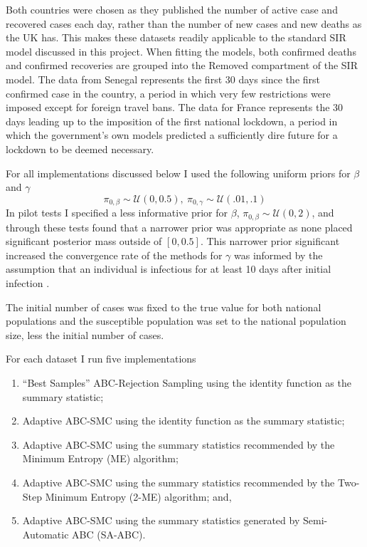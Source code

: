 \documentclass[11pt,a4paper]{article}
\theoremstyle{break}
\begin{document}
  \par Both countries were chosen as they published the number of active case and recovered cases each day, rather than the number of new cases and new deaths as the UK has. This makes these datasets readily applicable to the standard SIR model discussed in this project. When fitting the models, both confirmed deaths and confirmed recoveries are grouped into the Removed compartment of the SIR model. The data from Senegal represents the first 30 days since the first confirmed case in the country, a period in which very few restrictions were imposed except for foreign travel bans. The data for France represents the 30 days leading up to the imposition of the first national lockdown, a period in which the government's own models predicted a sufficiently dire future for a lockdown to be deemed necessary.

  \par For all implementations discussed below I used the following uniform priors for $\beta$ and $\gamma$
  \[ \pi_{0,\beta}\sim\mathcal{U}(0,0.5),\ \pi_{0,\gamma}\sim\mathcal{U}(.01,.1) \]
  In pilot tests I specified a less informative prior for $\beta$, $\pi_{0,\beta}\sim\mathcal{U}(0,2)$, and through these tests found that a narrower prior was appropriate as none placed significant posterior mass outside of $[0,0.5]$. This narrower prior significant increased the convergence rate of the methods for $\gamma$ was informed by the assumption that an individual is infectious for at least 10 days after initial infection \cite{inferred_duration_of_infectious_period_of_sars_cov_2}.

  \par The initial number of cases was fixed to the true value for both national populations \cite[]{world_bank} and the susceptible population was set to the national population size, less the initial number of cases.

  \par For each dataset I run five implementations
  \begin{enumerate}[label=(I\arabic*)]
    \item ``Best Samples'' ABC-Rejection Sampling using the identity function as the summary statistic; \label{real_implementation_1}
    \item Adaptive ABC-SMC using the identity function as the summary statistic;\label{real_implementation_2}
    \item Adaptive ABC-SMC using the summary statistics recommended by the Minimum Entropy (ME) algorithm;\label{real_implementation_3}
    \item Adaptive ABC-SMC using the summary statistics recommended by the Two-Step Minimum Entropy (2-ME) algorithm; and,\label{real_implementation_4}
    \item Adaptive ABC-SMC using the summary statistics generated by Semi-Automatic ABC (SA-ABC).\label{real_implementation_5}
  \end{enumerate}
\end{document}
